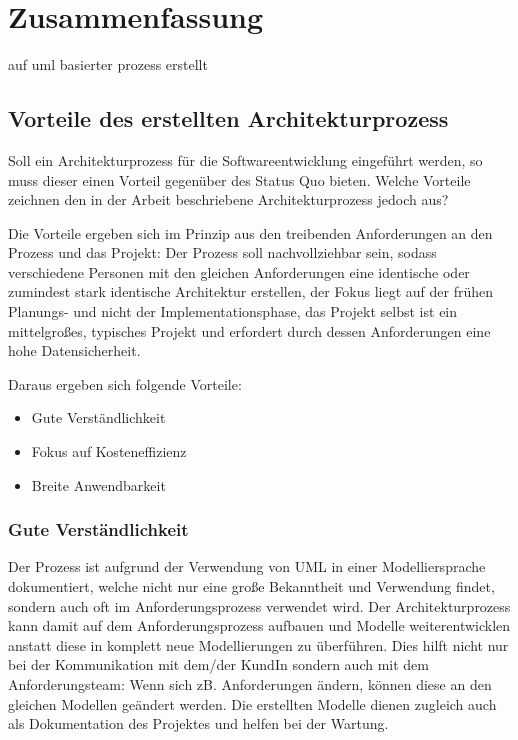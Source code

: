 \chapter{Zusammenfassung}
auf uml basierter prozess erstellt



\section{Vorteile des erstellten Architekturprozess}
Soll ein Architekturprozess für die Softwareentwicklung eingeführt werden, so muss dieser einen Vorteil gegenüber des Status Quo bieten. Welche Vorteile zeichnen den in der Arbeit beschriebene Architekturprozess jedoch aus?

Die Vorteile ergeben sich im Prinzip aus den treibenden Anforderungen an den Prozess und das Projekt: Der Prozess soll nachvollziehbar sein, sodass verschiedene Personen mit den gleichen Anforderungen eine identische oder zumindest stark identische Architektur erstellen, der Fokus liegt auf der frühen Planungs- und nicht der Implementationsphase, das Projekt selbst ist ein mittelgroßes, typisches Projekt und erfordert durch dessen Anforderungen eine hohe Datensicherheit.

Daraus ergeben sich folgende Vorteile:

\begin{itemize}
  \item Gute Verständlichkeit
  \item Fokus auf Kosteneffizienz
  \item Breite Anwendbarkeit
\end{itemize}

\subsection{Gute Verständlichkeit}
Der Prozess ist aufgrund der Verwendung von UML in einer Modelliersprache dokumentiert, welche nicht nur eine große Bekanntheit und Verwendung findet, sondern auch oft im Anforderungsprozess verwendet wird. Der Architekturprozess kann damit auf dem Anforderungsprozess aufbauen und Modelle weiterentwicklen anstatt diese in komplett neue Modellierungen zu überführen. Dies hilft nicht nur bei der Kommunikation mit dem/der KundIn sondern auch mit dem Anforderungsteam: Wenn sich zB. Anforderungen ändern, können diese an den gleichen Modellen geändert werden. Die erstellten Modelle dienen zugleich auch als Dokumentation des Projektes und helfen bei der Wartung.

